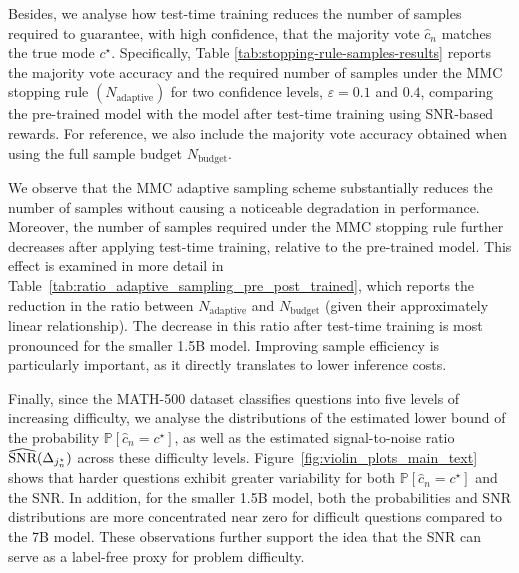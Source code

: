 Besides, we analyse how test-time training reduces the number of samples required to guarantee, with high confidence, that the majority vote $\widehat{c}_n$  matches the true mode $c^\star$. 
Specifically, Table \ref{tab:stopping-rule-samples-results} reports the majority vote accuracy and the required number of samples under the MMC stopping rule $(N_{\text{adaptive}})$ for two confidence levels, $\varepsilon = 0.1$ and $0.4$, comparing the pre-trained model with the model after test-time training using SNR-based rewards. 
For reference, we also include the majority vote accuracy obtained when using the full sample budget $N_{\text{budget}}$.

We observe that the MMC adaptive sampling scheme substantially reduces the number of samples without causing a noticeable degradation in performance. Moreover, the number of samples required under the MMC stopping rule further decreases after applying test-time training, relative to the pre-trained model. 
This effect is examined in more detail in Table~\ref{tab:ratio_adaptive_sampling_pre_post_trained}, which reports the reduction in the ratio between $N_{\text{adaptive}}$ and $N_{\text{budget}}$ (given their approximately linear relationship). 
The decrease in this ratio after test-time training is most pronounced for the smaller 1.5B model.
Improving sample efficiency is particularly important, as it directly translates to lower inference costs.


Finally, since the MATH-500 dataset classifies questions into five levels of increasing difficulty, we analyse the distributions of the estimated lower bound of the probability $\mathbb{P}[\widehat{c}_n = c^\star]$, as well as the estimated signal-to-noise ratio $\reallywidehat{\text{SNR}}(\Delta_{j_n^\star})$ across these difficulty levels.
Figure~\ref{fig:violin_plots_main_text} shows that harder questions exhibit greater variability for both $\mathbb{P}[\widehat{c}_n = c^\star]$ and the SNR. 
In addition,  for the smaller 1.5B model, both the  probabilities and SNR distributions are more concentrated near zero for difficult questions compared to the 7B model.
These observations further support the idea that the SNR can serve as a label-free proxy for problem difficulty.




